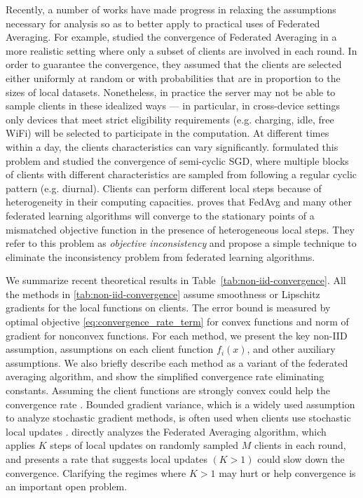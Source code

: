 \documentclass[11pt]{article}
\begin{document}
Recently, a number of works have made progress in relaxing the assumptions necessary for analysis so as to better apply to practical uses of Federated Averaging. For example, \citet{li2019convergence} studied the convergence of Federated Averaging in a more realistic setting where only a subset of clients are involved in each round. In order to guarantee the convergence, they assumed that the clients are selected either uniformly at random or with probabilities that are in proportion to the sizes of local datasets. %
Nonetheless, in practice the server may not be able to sample clients in these idealized ways --- in particular, in cross-device settings only devices that meet strict eligibility requirements (e.g. charging, idle, free WiFi) will be selected to participate in the computation. At different times within a day, the clients characteristics can vary significantly. \citet{eichner19semicyclic} formulated this problem and studied the convergence of semi-cyclic SGD, where multiple blocks of clients with different characteristics are sampled from following a regular cyclic pattern (e.g. diurnal). Clients can perform different local steps because of heterogeneity in their computing capacities. \citet{wang2020tackling} proves that FedAvg and many other federated learning algorithms will converge to the stationary points of a mismatched objective function in the presence of heterogeneous local steps. They refer to this problem as \emph{objective inconsistency} and propose a simple technique to eliminate the inconsistency problem from federated learning algorithms.

We summarize recent theoretical results in Table~\ref{tab:non-iid-convergence}. All the methods in \cref{tab:non-iid-convergence} assume smoothness or Lipschitz gradients for the local functions on clients. 
The error bound is measured by optimal objective \eqref{eq:convergence_rate_term} for convex functions and norm of gradient for nonconvex functions. 
For each method, we present the key non-IID assumption, assumptions on each client function $f_i(x)$, and other auxiliary assumptions. We also briefly describe each method as a variant of the federated averaging algorithm, and show the simplified convergence rate eliminating constants.
 Assuming the client functions are strongly convex could help the convergence rate \citep{li2019convergence,karimireddy2019scaffold}.
 Bounded gradient variance, which is a widely used assumption to analyze stochastic gradient methods, is often used when clients use stochastic local updates \citep{Lian2017b,li2019convergence,li2019communication,wang2019matcha,karimireddy2019scaffold}. 
 \citet{li2019convergence} directly analyzes the Federated Averaging algorithm, which applies $K$ steps of local updates on randomly sampled $M$ clients in each round, and presents a rate that suggests local updates $(K > 1)$ could slow down the convergence. Clarifying the regimes where $K > 1$ may hurt or help convergence is an important open problem.
\end{document}
